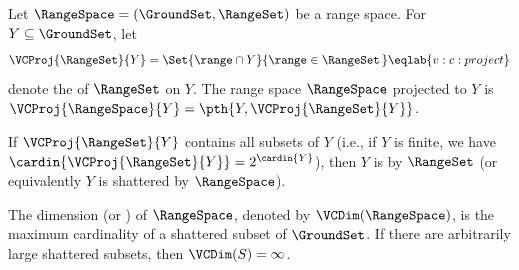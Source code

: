 \begin{defn}
        Let $\RangeSpace = (\GroundSet,\RangeSet)$ be a range
        space. For $Y \subseteq \GroundSet$, let
        \begin{equation}
            \VCProj{\RangeSet}{Y}%
            =%
            \Set{\range \cap Y}{ \range \in \RangeSet\bigr.\,}
            \eqlab{v:c:project}
        \end{equation}
        denote the  of
        $\RangeSet$ on $Y$. The range space $\RangeSpace$ projected to
        $Y$ is $\VCProj{\RangeSpace}{Y} = \pth{Y,
           \VCProj{\RangeSet}{Y}}$.
        
        If $\VCProj{\RangeSet}{Y}$ contains all subsets of $Y$ (i.e.,
        if $Y$ is finite, we have $\cardin{\VCProj{\RangeSet}{Y}} =
        2^{\cardin{Y}}$), then $Y$ is  by $\RangeSet$
        (or equivalently $Y$ is shattered by $\RangeSpace$).
        
        The  dimension (or
        ) of
        $\RangeSpace$, denoted by $\VCDim(\RangeSpace)$, is the
        maximum cardinality of a shattered subset of $\GroundSet$. If
        there are arbitrarily large shattered subsets, then
        $\VCDim(S) = \infty$.
    \end{defn}
